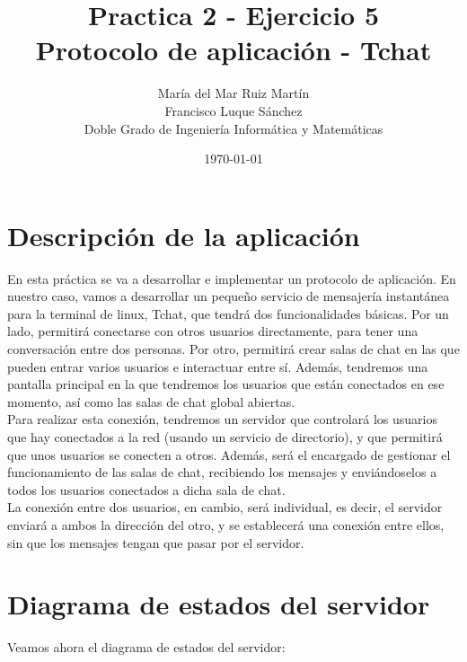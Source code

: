 \documentclass[12pt]{article}       %
\title{Practica 2 - Ejercicio 5\\
       \huge Protocolo de aplicación - Tchat}
\author{
        María del Mar Ruiz Martín\\
        Francisco Luque Sánchez\\
        Doble Grado de Ingeniería Informática y Matemáticas\\
}
\date{\today}
\begin{document}
\maketitle

\section{Descripción de la aplicación}
En esta práctica se va a desarrollar e implementar un protocolo de aplicación. En nuestro caso, vamos a desarrollar un pequeño servicio de mensajería instantánea para la terminal de linux, Tchat, que tendrá dos funcionalidades básicas. Por un lado, permitirá conectarse con otros usuarios directamente, para tener una conversación entre dos personas. Por otro, permitirá crear salas de chat en las que pueden entrar varios usuarios e interactuar entre sí. Además, tendremos una pantalla principal en la que tendremos los usuarios que están conectados en ese momento, así como las salas de chat global abiertas.\\

Para realizar esta conexión, tendremos un servidor que controlará los usuarios que hay conectados a la red (usando un servicio de directorio), y que permitirá que unos usuarios se conecten a otros. Además, será el encargado de gestionar el funcionamiento de las salas de chat, recibiendo los mensajes y enviándoselos a todos los
usuarios conectados a dicha sala de chat.\\

La conexión entre dos usuarios, en cambio, será individual, es decir, el servidor enviará a ambos la dirección del otro, y se establecerá una conexión entre ellos, sin que los mensajes tengan que pasar por el servidor.

\newpage

\section{Diagrama de estados del servidor}

Veamos ahora el diagrama de estados del servidor:\\
\end{document}
